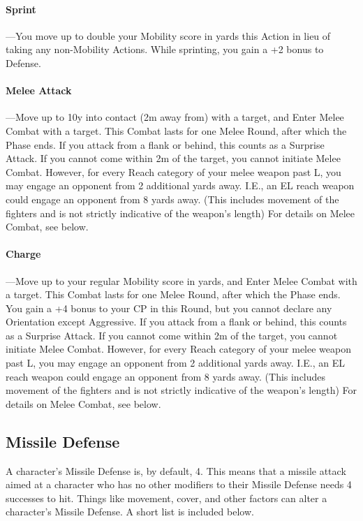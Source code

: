 \documentclass[oneside,11pt,english]{book}
\begin{document}
\paragraph{\label{par:Sprint} Sprint}---\quad You move up to double your Mobility score in yards this Action in lieu of taking any non-Mobility Actions. While sprinting, you gain a +2 bonus to Defense.

\paragraph{\label{par:Melee Attack} Melee Attack}---\quad Move up to 10y into contact (2m away from) with a target, and Enter Melee Combat with a target. This Combat lasts for one Melee Round, after which the Phase ends. If you attack from a flank or
behind, this counts as a Surprise Attack. If you cannot come within 2m of the target, you cannot initiate
Melee Combat. However, for every Reach category of your melee weapon past L, you may engage an
opponent from 2 additional yards away. I.E., an EL reach weapon could engage an opponent from 8 yards
away. (This includes movement of the fighters and is not strictly indicative of the weapon’s length)
For details on Melee Combat, see below.

\paragraph{\label{par:Charge} Charge}---\quad Move up to your regular Mobility score in yards, and Enter Melee Combat with a target. This
Combat lasts for one Melee Round, after which the Phase ends. You gain a +4 bonus to your CP in this
Round, but you cannot declare any Orientation except Aggressive. If you attack from a flank or
behind, this counts as a Surprise Attack. If you cannot come within 2m of the target, you cannot initiate
Melee Combat. However, for every Reach category of your melee weapon past L, you may engage an
opponent from 2 additional yards away. I.E., an EL reach weapon could engage an opponent from 8 yards
away. (This includes movement of the fighters and is not strictly indicative of the weapon’s length)
For details on Melee Combat, see below.

\subsection{Missile Defense}
A character’s Missile Defense is, by default, 4. This means that a missile attack aimed at a character who
has no other modifiers to their Missile Defense needs 4 successes to hit. Things like movement, cover,
and other factors can alter a character’s Missile Defense. A short list is included below.
\end{document}
